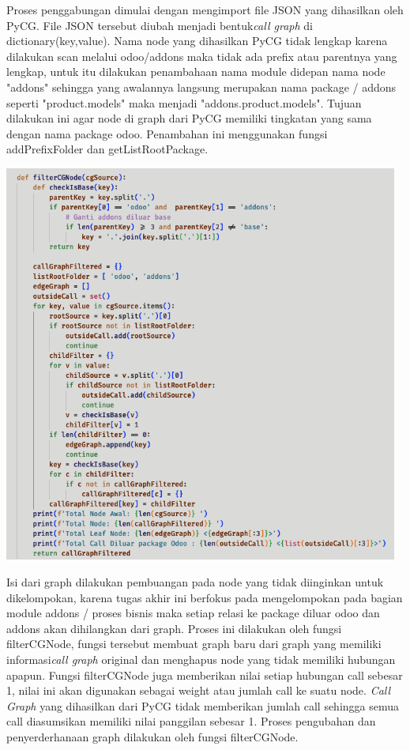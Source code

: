 Proses penggabungan dimulai dengan mengimport file JSON yang dihasilkan oleh PyCG. File JSON tersebut diubah menjadi bentuk\textit{call graph} di dictionary(key,value). Nama node yang dihasilkan PyCG tidak lengkap karena dilakukan scan melalui odoo/addons maka tidak ada prefix atau parentnya yang lengkap, untuk itu dilakukan penambahaan nama module didepan nama node "addons" sehingga yang awalannya langsung merupakan nama package / addons seperti "product.models" maka menjadi "addons.product.models". Tujuan dilakukan ini agar node di graph dari PyCG memiliki tingkatan yang sama dengan nama package odoo. Penambahan ini menggunakan fungsi addPrefixFolder dan getListRootPackage.

\begin{center}
	\includegraphics[width=13cm]{img/bab_4/ekstraksi_2.png}
	\label{fig:ekstraksi_2}
\end{center}

Isi dari graph dilakukan pembuangan pada node yang tidak diinginkan untuk dikelompokan, karena tugas akhir ini berfokus pada mengelompokan pada bagian module addons / proses bisnis maka setiap relasi ke package diluar  odoo dan addons akan dihilangkan dari graph. Proses ini dilakukan oleh fungsi filterCGNode, fungsi tersebut membuat graph baru dari graph yang memiliki informasi\textit{call graph} original dan menghapus node yang tidak memiliki hubungan apapun. Fungsi filterCGNode juga memberikan nilai setiap hubungan call sebesar 1, nilai ini akan digunakan sebagai weight atau jumlah call ke suatu node. \textit{Call Graph} yang dihasilkan dari PyCG tidak memberikan jumlah call sehingga semua call diasumsikan memiliki nilai panggilan sebesar 1. Proses pengubahan dan penyerderhanaan graph dilakukan oleh fungsi filterCGNode.

